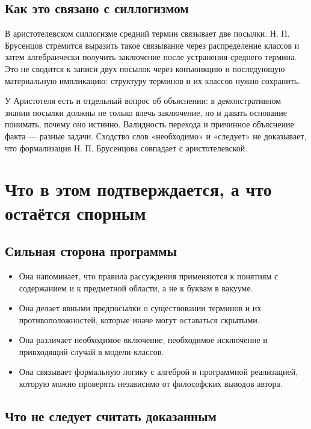 \documentclass[12pt,a4paper]{article}
\begin{document}
\subsection{Как это связано с силлогизмом}

В аристотелевском силлогизме средний термин связывает две посылки. Н. П. Брусенцов стремится выразить такое связывание через распределение классов и затем алгебраически получить заключение после устранения среднего термина. Это не сводится к записи двух посылок через конъюнкцию и последующую материальную импликацию: структуру терминов и их классов нужно сохранить.

У Аристотеля есть и отдельный вопрос об объяснении: в демонстративном знании посылки должны не только влечь заключение, но и давать основание понимать, почему оно истинно. Валидность перехода и причинное объяснение факта — разные задачи. Сходство слов «необходимо» и «следует» не доказывает, что формализация Н. П. Брусенцова совпадает с аристотелевской.

\section{Что в этом подтверждается, а что остаётся спорным}

\subsection{Сильная сторона программы}

\begin{itemize}
\item Она напоминает, что правила рассуждения применяются к понятиям с содержанием и к предметной области, а не к буквам в вакууме.
\item Она делает явными предпосылки о существовании терминов и их противоположностей, которые иначе могут оставаться скрытыми.
\item Она различает необходимое включение, необходимое исключение и привходящий случай в модели классов.
\item Она связывает формальную логику с алгеброй и программной реализацией, которую можно проверять независимо от философских выводов автора.
\end{itemize}
\subsection{Что не следует считать доказанным}
\end{document}
